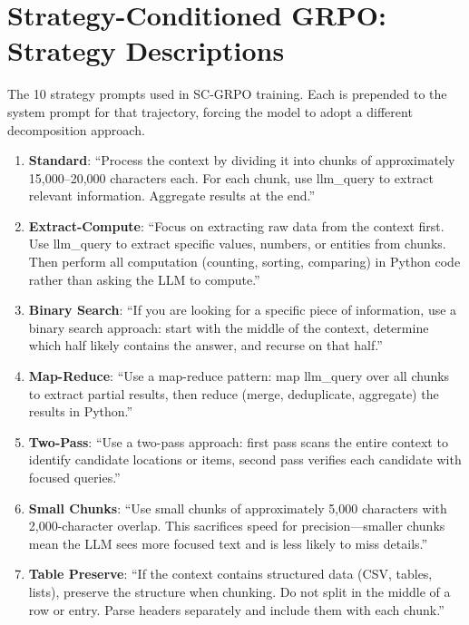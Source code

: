\documentclass{article}
\begin{document}
\section{Strategy-Conditioned GRPO: Strategy Descriptions}
\label{app:strategies}

The 10 strategy prompts used in SC-GRPO training. Each is prepended to the system prompt for that trajectory, forcing the model to adopt a different decomposition approach.

\begin{enumerate}
    \item \textbf{Standard}: ``Process the context by dividing it into chunks of approximately 15,000--20,000 characters each. For each chunk, use llm\_query to extract relevant information. Aggregate results at the end.''

    \item \textbf{Extract-Compute}: ``Focus on extracting raw data from the context first. Use llm\_query to extract specific values, numbers, or entities from chunks. Then perform all computation (counting, sorting, comparing) in Python code rather than asking the LLM to compute.''

    \item \textbf{Binary Search}: ``If you are looking for a specific piece of information, use a binary search approach: start with the middle of the context, determine which half likely contains the answer, and recurse on that half.''

    \item \textbf{Map-Reduce}: ``Use a map-reduce pattern: map llm\_query over all chunks to extract partial results, then reduce (merge, deduplicate, aggregate) the results in Python.''

    \item \textbf{Two-Pass}: ``Use a two-pass approach: first pass scans the entire context to identify candidate locations or items, second pass verifies each candidate with focused queries.''

    \item \textbf{Small Chunks}: ``Use small chunks of approximately 5,000 characters with 2,000-character overlap. This sacrifices speed for precision---smaller chunks mean the LLM sees more focused text and is less likely to miss details.''

    \item \textbf{Table Preserve}: ``If the context contains structured data (CSV, tables, lists), preserve the structure when chunking. Do not split in the middle of a row or entry. Parse headers separately and include them with each chunk.''


\end{enumerate}
\end{document}
